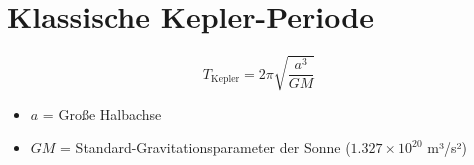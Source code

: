 \section{Klassische Kepler-Periode}
\[
T_{\text{Kepler}} = 2\pi \sqrt{\frac{a^3}{GM}}
\]
\begin{itemize}
\item $a$ = Große Halbachse
\item $GM$ = Standard-Gravitationsparameter der Sonne ($1.327\times10^{20}$ m³/s²)
\end{itemize}